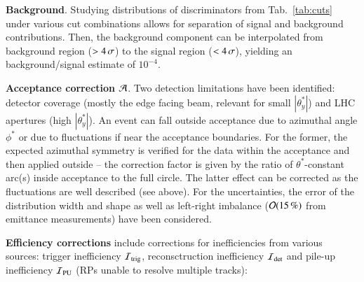 {\bf Background}. Studying distributions of discriminators from Tab.~\ref{tab:cuts} under various cut combinations allows for separation of signal and background contributions. Then, the background component can be interpolated from background region ($> 4\,{\rm \sigma}$) to the signal region ($< 4\,{\rm \sigma}$), yielding an background/signal estimate of $10^{-4}$.

{\bf Acceptance correction} ${\cal A}$. Two detection limitations have been identified: detector coverage (mostly the edge facing beam, relevant for small $|\theta_y^*|$) and LHC apertures (high $|\theta_y^*|$). An event can fall outside acceptance due to azimuthal angle $\phi^*$ or due to fluctuations if near the acceptance boundaries. For the former, the expected azimuthal symmetry is verified for the data within the acceptance and then applied outside -- the correction factor is given by the ratio of $\theta^*$-constant arc(s) inside acceptance to the full circle. The latter effect can be corrected as the fluctuations are well described (see above). For the uncertainties, the error of the distribution width and shape as well as left-right imbalance (${\cal O}(15\,{\rm \%})$ from emittance measurements) have been considered.

{\bf Efficiency corrections} include corrections for inefficiencies from various sources: trigger inefficiency ${\cal I}_{\rm trig}$, reconsctruction inefficiency ${\cal I}_{\rm det}$ and pile-up inefficiency ${\cal I}_{\rm PU}$ (RPs unable to resolve multiple tracks):

